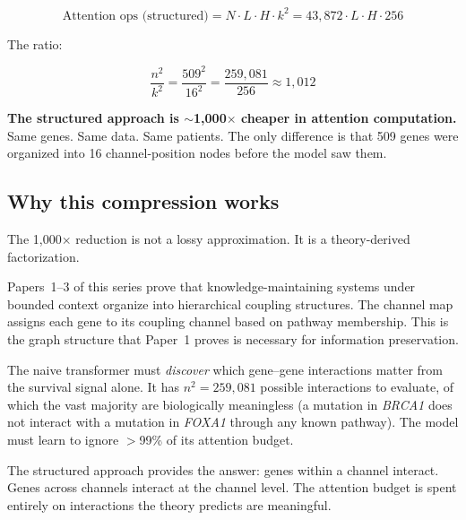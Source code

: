 \begin{equation}
\text{Attention ops (structured)} = N \cdot L \cdot H \cdot k^2
= 43{,}872 \cdot L \cdot H \cdot 256
\end{equation}

The ratio:

\begin{equation}
\frac{n^2}{k^2} = \frac{509^2}{16^2} = \frac{259{,}081}{256}
\approx 1{,}012
\end{equation}

\textbf{The structured approach is $\sim$1{,}000$\times$ cheaper
in attention computation.} Same genes. Same data. Same patients.
The only difference is that 509 genes were organized into 16
channel-position nodes before the model saw them.

\subsection{Why this compression works}

The 1{,}000$\times$ reduction is not a lossy approximation.
It is a theory-derived factorization.

Papers~1--3 of this series prove that knowledge-maintaining systems
under bounded context organize into hierarchical coupling
structures. The channel map assigns each gene to its coupling
channel based on pathway membership. This is the graph structure
that Paper~1 proves is necessary for information preservation.

The naive transformer must \emph{discover} which gene--gene
interactions matter from the survival signal alone. It has
$n^2 = 259{,}081$ possible interactions to evaluate, of which
the vast majority are biologically meaningless (a mutation in
\emph{BRCA1} does not interact with a mutation in \emph{FOXA1}
through any known pathway). The model must learn to ignore
$>$99\% of its attention budget.

The structured approach provides the answer: genes within a
channel interact. Genes across channels interact at the channel
level. The attention budget is spent entirely on interactions
the theory predicts are meaningful.

